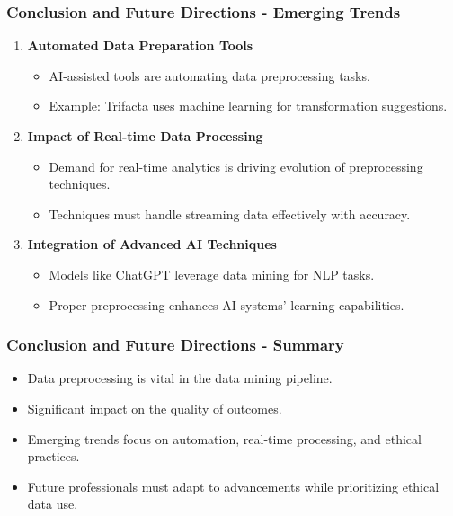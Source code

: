 \documentclass[aspectratio=169]{beamer}
\begin{document}
\begin{frame}[fragile]
    \frametitle{Conclusion and Future Directions - Emerging Trends}
    \begin{enumerate}
        \item \textbf{Automated Data Preparation Tools}
        \begin{itemize}
            \item AI-assisted tools are automating data preprocessing tasks.
            \item Example: Trifacta uses machine learning for transformation suggestions.
        \end{itemize}

        \item \textbf{Impact of Real-time Data Processing}
        \begin{itemize}
            \item Demand for real-time analytics is driving evolution of preprocessing techniques.
            \item Techniques must handle streaming data effectively with accuracy.
        \end{itemize}

        \item \textbf{Integration of Advanced AI Techniques}
        \begin{itemize}
            \item Models like ChatGPT leverage data mining for NLP tasks.
            \item Proper preprocessing enhances AI systems’ learning capabilities.
        \end{itemize}
    \end{enumerate}
\end{frame}

\begin{frame}[fragile]
    \frametitle{Conclusion and Future Directions - Summary}
    \begin{itemize}
        \item Data preprocessing is vital in the data mining pipeline.
        \item Significant impact on the quality of outcomes.
        \item Emerging trends focus on automation, real-time processing, and ethical practices.
        \item Future professionals must adapt to advancements while prioritizing ethical data use.
    \end{itemize}
\end{frame}
\end{document}
